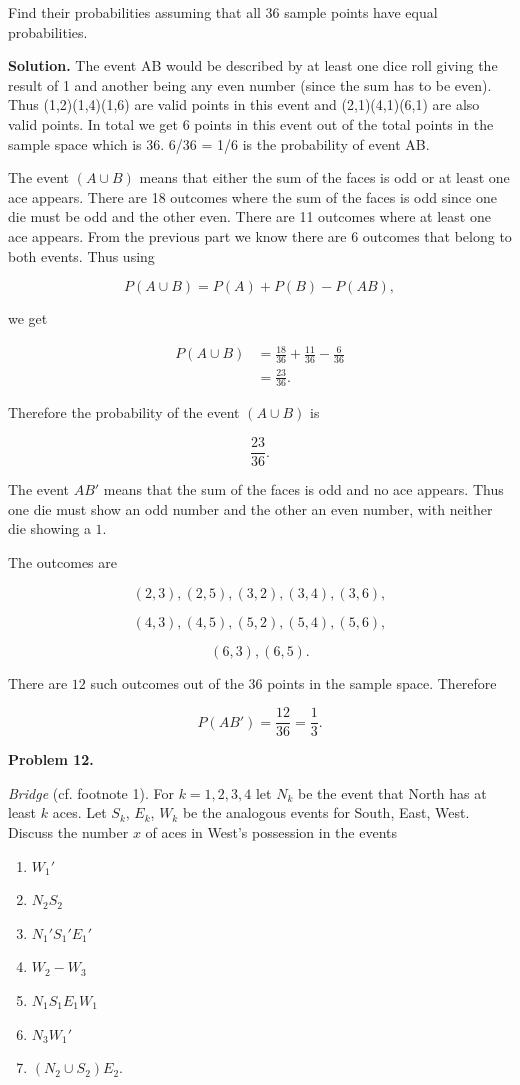\documentclass[12pt]{article}
\begin{document}
Find their probabilities assuming that all 36 sample points have equal
probabilities.


\textbf{Solution.}
The event AB would be described by at least one dice roll giving the result of 1 and another being any even number (since the sum has to be even). Thus (1,2)(1,4)(1,6) are valid points in this event and (2,1)(4,1)(6,1) are also valid points. In total we get 6 points in this event out of the total points in the sample space which is 36. 6/36 = 1/6 is the probability of event AB.

The event $(A \cup B)$ means that either the sum of the faces is odd or at least one ace appears. There are 18 outcomes where the sum of the faces is odd since one die must be odd and the other even. There are 11 outcomes where at least one ace appears. From the previous part we know there are 6 outcomes that belong to both events. Thus using

\[
P(A \cup B)=P(A)+P(B)-P(AB),
\]

we get

\[
\begin{aligned}
P(A \cup B)
&= \frac{18}{36}+\frac{11}{36}-\frac{6}{36} \\
&= \frac{23}{36}.
\end{aligned}
\]

Therefore the probability of the event $(A \cup B)$ is

\[
\frac{23}{36}.
\]
 
The event $AB'$ means that the sum of the faces is odd and no ace appears. Thus one die must show an odd number and the other an even number, with neither die showing a $1$.

The outcomes are

\[
(2,3),(2,5),(3,2),(3,4),(3,6),
\]

\[
(4,3),(4,5),(5,2),(5,4),(5,6),
\]

\[
(6,3),(6,5).
\]

There are $12$ such outcomes out of the $36$ points in the sample space. Therefore

\[
P(AB')
=
\frac{12}{36}
=
\frac13.
\]


\textbf{Problem 12.}

\textit{Bridge} (cf. footnote 1). For $k=1,2,3,4$ let $N_k$ be the event that
North has at least $k$ aces. Let $S_k$, $E_k$, $W_k$ be the analogous events
for South, East, West. Discuss the number $x$ of aces in West's possession in
the events

\begin{enumerate}
    \item[(a)] $W_1'$
    \item[(b)] $N_2S_2$
    \item[(c)] $N_1'S_1'E_1'$
    \item[(d)] $W_2 - W_3$
    \item[(e)] $N_1S_1E_1W_1$
    \item[(f)] $N_3W_1'$
    \item[(g)] $(N_2 \cup S_2)E_2$.
\end{enumerate}
\end{document}
